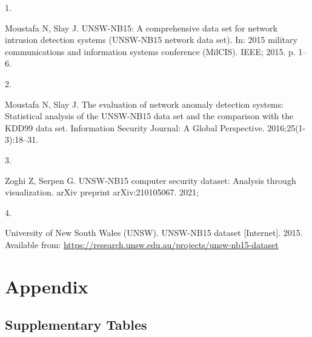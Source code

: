 \documentclass[
  a4paper,
]{scrreprt}
\newlength{\cslhangindent}
\newlength{\csllabelwidth}
\newenvironment{CSLReferences}[2] %
 {\begin{list}{}{%
  \setlength{\itemindent}{0pt}
  \setlength{\leftmargin}{0pt}
  \setlength{\parsep}{0pt}
  \ifodd #1
   \setlength{\leftmargin}{\cslhangindent}
   \setlength{\itemindent}{-1\cslhangindent}
  \fi
  \setlength{\itemsep}{#2\baselineskip}}}
 {\end{list}}
\newcommand{\CSLLeftMargin}[1]{\parbox[t]{\csllabelwidth}{\strut#1\strut}}
\newcommand{\CSLRightInline}[1]{\parbox[t]{\linewidth - \csllabelwidth}{\strut#1\strut}}
\begin{document}
\label{refs}
\begin{CSLReferences}{0}{1}
\CSLLeftMargin{1. }%
\CSLRightInline{Moustafa N, Slay J. UNSW-NB15: A comprehensive data set
for network intrusion detection systems (UNSW-NB15 network data set).
In: 2015 military communications and information systems conference
(MilCIS). IEEE; 2015. p. 1--6. }

\CSLLeftMargin{2. }%
\CSLRightInline{Moustafa N, Slay J. The evaluation of network anomaly
detection systems: Statistical analysis of the UNSW-NB15 data set and
the comparison with the KDD99 data set. Information Security Journal: A
Global Perspective. 2016;25(1-3):18--31. }

\CSLLeftMargin{3. }%
\CSLRightInline{Zoghi Z, Serpen G. UNSW-NB15 computer security dataset:
Analysis through visualization. arXiv preprint arXiv:210105067. 2021; }

\CSLLeftMargin{4. }%
\CSLRightInline{University of New South Wales (UNSW). UNSW-NB15 dataset
{[}Internet{]}. 2015. Available from:
\url{https://research.unsw.edu.au/projects/unsw-nb15-dataset}}

\end{CSLReferences}


\chapter*{Appendix}\label{appendix}


\section*{Supplementary Tables}\label{supplementary-tables}

\end{document}

